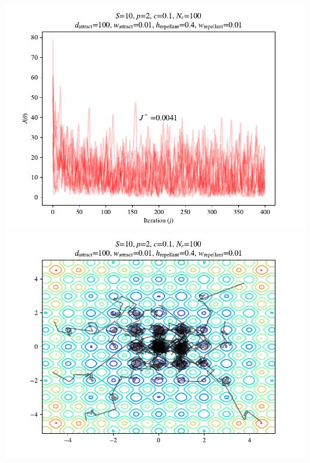 \documentclass{beamer}
\begin{document}
\begin{frame}
\begin{columns}[T]
\begin{center}
    \includegraphics[scale=0.3]{assets/rastrigin_colony_400_J}
    \includegraphics[scale=0.3]{assets/rastrigin_colony_400_theta}
  \end{center}
\end{columns}
\end{frame}
\end{document}
